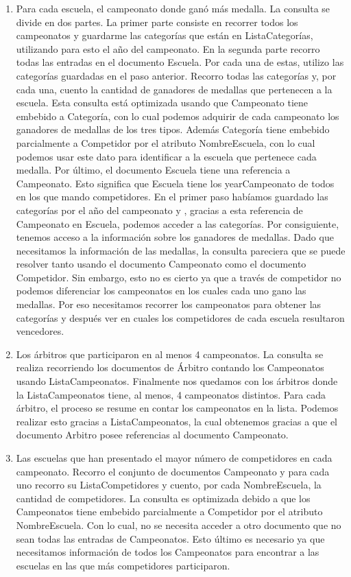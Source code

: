 \begin{enumerate}
\item Para cada escuela, el campeonato donde ganó más medalla. La consulta se divide en dos partes. La primer parte consiste
en recorrer todos los campeonatos y guardarme las categorías que están en ListaCategorías, utilizando para esto el año del
campeonato. En la segunda parte recorro todas las entradas en el documento Escuela. Por cada una de estas, utilizo las
categorías guardadas en el paso anterior. Recorro todas las categorías y, por cada una, cuento la cantidad de ganadores de
medallas que pertenecen a la escuela. Esta consulta está optimizada usando que Campeonato tiene embebido a Categoría, con lo
cual podemos adquirir de cada campeonato los ganadores de medallas de los tres tipos. Además Categoría tiene embebido parcialmente
a Competidor por el atributo NombreEscuela, con lo cual podemos usar este dato para identificar a la escuela que pertenece cada
medalla. Por último, el documento Escuela tiene una referencia a Campeonato. Esto significa que Escuela tiene los yearCampeonato
de todos en los que mando competidores. En el primer paso habíamos guardado las categorías por el año del campeonato y ,
gracias a esta referencia de Campeonato en Escuela, podemos acceder a las categorías. Por consiguiente, tenemos acceso a la
información sobre los ganadores de medallas. Dado que necesitamos la información de las medallas, la consulta pareciera que
se puede resolver tanto usando el documento Campeonato como el documento Competidor. Sin embargo, esto no es cierto ya que
a través de competidor no podemos diferenciar los campeonatos en los cuales cada uno gano las medallas. Por eso necesitamos recorrer
los campeonatos para obtener las categorías y después ver en cuales los competidores de cada escuela resultaron vencedores.

\item Los árbitros que participaron en al menos 4 campeonatos. La consulta se realiza recorriendo los documentos
de Árbitro contando los Campeonatos usando ListaCampeonatos. Finalmente nos quedamos con los árbitros donde la ListaCampeonatos
tiene, al menos, 4 campeonatos distintos. Para cada árbitro, el proceso se resume en contar los campeonatos en la lista.
Podemos realizar esto gracias a ListaCampeonatos, la cual obtenemos gracias a que el documento Arbitro posee referencias
al documento Campeonato.

\item Las escuelas que han presentado el mayor número de competidores en cada campeonato. Recorro el conjunto de documentos
Campeonato y para cada uno recorro su ListaCompetidores y cuento, por cada NombreEscuela, la cantidad de competidores.
La consulta es optimizada debido a que los Campeonatos tiene embebido parcialmente a Competidor por el atributo
NombreEscuela. Con lo cual, no se necesita acceder a otro documento que no sean todas las entradas de Campeonatos.
Esto último es necesario ya que necesitamos información de todos los Campeonatos para encontrar a las escuelas en las
que más competidores participaron.


\end{enumerate}
